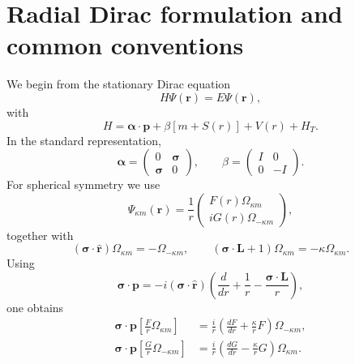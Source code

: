 \documentclass[a4paper,fleqn]{cas-dc}
\begin{document}
\section{Radial Dirac formulation and common conventions}
We begin from the stationary Dirac equation
\begin{equation}
H\Psi(\mathbf r)=E\Psi(\mathbf r),
\end{equation}
with
\begin{equation}
H=
\boldsymbol{\alpha}\cdot\mathbf p
+\beta[m+S(r)]
+V(r)+H_T.
\end{equation}
In the standard representation,
\begin{equation}
\boldsymbol{\alpha}=
\begin{pmatrix}0&\boldsymbol{\sigma}\\ \boldsymbol{\sigma}&0\end{pmatrix},
\qquad
\beta=
\begin{pmatrix}I&0\\0&-I\end{pmatrix}.
\end{equation}
For spherical symmetry we use
\begin{equation}
\Psi_{\kappa m}(\mathbf r)=
\frac1r
\begin{pmatrix}
F(r)\Omega_{\kappa m}\\
iG(r)\Omega_{-\kappa m}
\end{pmatrix},
\end{equation}
together with
\begin{equation}
(\boldsymbol{\sigma}\!\cdot\!\hat{\mathbf r})\Omega_{\kappa m}
=-\Omega_{-\kappa m},
\qquad
(\boldsymbol{\sigma}\!\cdot\!\mathbf L+1)\Omega_{\kappa m}
=-\kappa\Omega_{\kappa m}.
\end{equation}
Using
\begin{equation}
\boldsymbol{\sigma}\cdot\mathbf p
=-i(\boldsymbol{\sigma}\cdot\hat{\mathbf r})
\left(
\frac{d}{dr}+\frac1r-\frac{\boldsymbol{\sigma}\cdot\mathbf L}{r}
\right),
\end{equation}
one obtains
\begin{align}
\boldsymbol{\sigma}\cdot\mathbf p
\left[\frac{F}{r}\Omega_{\kappa m}\right]
&=
\frac{i}{r}
\left(\frac{dF}{dr}+\frac{\kappa}{r}F\right)
\Omega_{-\kappa m},\\
\boldsymbol{\sigma}\cdot\mathbf p
\left[\frac{G}{r}\Omega_{-\kappa m}\right]
&=
\frac{i}{r}
\left(\frac{dG}{dr}-\frac{\kappa}{r}G\right)
\Omega_{\kappa m}.
\end{align}
\end{document}
